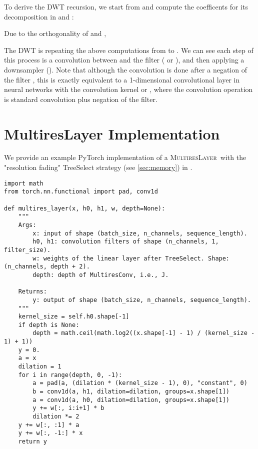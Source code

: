 \documentclass{article}
\theoremstyle{plain}
\theoremstyle{definition}
\theoremstyle{remark}
\newcommand{\ourlayer}{\textsc{MultiresLayer}}
\begin{document}
To derive the DWT recursion, we start from  and compute the coefficents for its decomposition in  and :

Due to the orthogonality of  and , 

The DWT is repeating the above computations from  to . 
We can see each step of this process is a convolution between  and the filter ( or ), and then applying a downsampler (). 
Note that although the convolution is done after a negation of the filter , this is exactly equivalent to a 1-dimensional convolutional layer in neural networks with the convolution kernel  or , where the convolution operation is standard convolution plus negation of the filter.  



\section{MultiresLayer Implementation}
\label{app:torch-impl}

We provide an example PyTorch implementation of a \ourlayer\ with the "resolution fading" TreeSelect strategy (see \cref{sec:memory}) in .

\begin{figure*}[h]
\centering
\begin{verbatim}
import math
from torch.nn.functional import pad, conv1d    

def multires_layer(x, h0, h1, w, depth=None):
    """
    Args:
        x: input of shape (batch_size, n_channels, sequence_length).
        h0, h1: convolution filters of shape (n_channels, 1, filter_size).
        w: weights of the linear layer after TreeSelect. Shape: (n_channels, depth + 2).
        depth: depth of MultiresConv, i.e., J.
    
    Returns:
        y: output of shape (batch_size, n_channels, sequence_length).
    """
    kernel_size = self.h0.shape[-1]
    if depth is None:
        depth = math.ceil(math.log2((x.shape[-1] - 1) / (kernel_size - 1) + 1))
    y = 0.
    a = x
    dilation = 1
    for i in range(depth, 0, -1):
        a = pad(a, (dilation * (kernel_size - 1), 0), "constant", 0)
        b = conv1d(a, h1, dilation=dilation, groups=x.shape[1])
        a = conv1d(a, h0, dilation=dilation, groups=x.shape[1])
        y += w[:, i:i+1] * b
        dilation *= 2
    y += w[:, :1] * a 
    y += w[:, -1:] * x
    return y
\end{verbatim}
\caption{PyTorch code for implementing a \ourlayer\ with the "resolution fading" TreeSelect strategy. } \label{fig:torch-impl}
\end{figure*}
\end{document}
